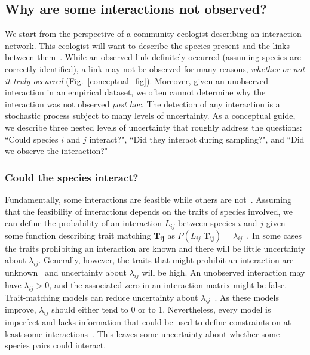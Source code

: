 \documentclass[12pt]{article}
\begin{document}
\begin{spacing}{2.0}


    \subsection*{Why are some interactions not observed?}

      We start from the perspective of a community ecologist describing an interaction network. This ecologist will want to describe the species present and the links between them~\citep{Roslin2016}. While an observed link definitely occurred (assuming species are correctly identified), a link may not be observed for many reasons, \emph{whether or not it truly occurred} (Fig.~\ref{conceptual_fig}). Moreover, given an unobserved interaction in an empirical dataset, we often cannot determine why the interaction was not observed \emph{post hoc}. The detection of any interaction is a stochastic process subject to many levels of uncertainty. As a conceptual guide, we describe three nested levels of uncertainty that roughly address the questions: ``Could species $i$ and $j$ interact?", ``Did they interact during sampling?", and ``Did we observe the interaction?"


        \subsubsection*{Could the species interact?} 

          Fundamentally, some interactions are feasible while others are not~\citep{Poisot2015}. Assuming that the feasibility of interactions depends on the traits of species involved, we can define the probability of an interaction $L_{ij}$ between species $i$ and $j$ given some function describing trait matching $\mathbf{T_{ij}}$ as $P(L_{ij}|\mathbf{T_{ij}})=\lambda_{ij}$~\citep{Bartomeus2013,Gravel2013,Weinstein2017}. In some cases the traits prohibiting an interaction are known and there will be little uncertainty about $\lambda_{ij}$. Generally, however, the traits that might prohibit an interaction are unknown~\citep{Dormann2017} and uncertainty about $\lambda_{ij}$ will be high. 
          An unobserved interaction may have $\lambda_{ij}>0$, and the associated zero in an interaction matrix might be false. Trait-matching models can reduce uncertainty about $\lambda_{ij}$~\citep{Jordano2016}. As these models improve, $\lambda_{ij}$ should either tend to 0 or to 1. Nevertheless, every model is imperfect and lacks information that could be used to define constraints on at least some interactions~\citep{Dormann2017}. This leaves some uncertainty about whether some species pairs could interact.



\end{spacing}
\end{document}
